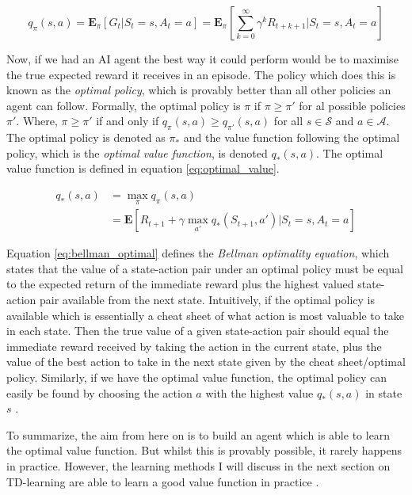 \documentclass[../dissertation.tex]{subfiles}
\begin{document}
\begin{equation}
\label{eq:value_function}
q_\pi(s, a) = \mathbf{E}_\pi[G_t | S_t = s, A_t = a] = \mathbf{E}_\pi [\sum_{k=0}^{\infty} \gamma^k R_{t+k+1} | S_t = s, A_t = a]
\end{equation}

Now, if we had an AI agent the best way it could perform would be to maximise the true expected reward it receives in an episode. The policy which does this is known as the \textit{optimal policy}, which is provably better than all other policies an agent can follow. Formally, the optimal policy is $\pi$ if $\pi \geq \pi'$ for al possible policies $\pi'$. Where, $\pi \geq \pi'$ if and only if $q_\pi(s,a) \geq q_{\pi'}(s,a)$ for all $s \in \mathcal{S}$ and $a \in \mathcal{A}$. The optimal policy is denoted as $\pi_*$ and the value function following the optimal policy, which is the \textit{optimal value function}, is denoted $q_*(s,a)$. The optimal value function is defined in equation \ref{eq:optimal_value}.

\begin{align}
q_*(s,a) & = \max_\pi q_\pi(s,a) \label{eq:optimal_value} \\
 & = \mathbf{E}[R_{t+1} + \gamma \max_{a'} q_* (S_{t+1}, a') | S_t = s, A_t = a]  \label{eq:bellman_optimal}
\end{align}

Equation \ref{eq:bellman_optimal} defines the \textit{Bellman optimality equation}, which states that the value of a state-action pair under an optimal policy must be equal to the expected return of the immediate reward plus the highest valued state-action pair available from the next state. Intuitively, if the optimal policy is available which is essentially a cheat sheet of what action is most valuable to take in each state. Then the true value of a given state-action pair should equal the immediate reward received by taking the action in the current state, plus the value of the best action to take in the next state given by the cheat sheet/optimal policy. Similarly, if we have the optimal value function, the optimal policy can easily be found by choosing the action $a$ with the highest value $q_*(s,a)$  in state $s$ \cite{sutton2011reinforcement}. 

To summarize, the aim from here on is to build an agent which is able to learn the optimal value function. But whilst this is provably possible, it rarely happens in practice. However, the learning methods I will discuss in the next section on TD-learning are able to learn a good value function in practice \cite{sutton1996generalization, konidaris2011value, uther1998tree, mnih2013playing}.
\end{document}
